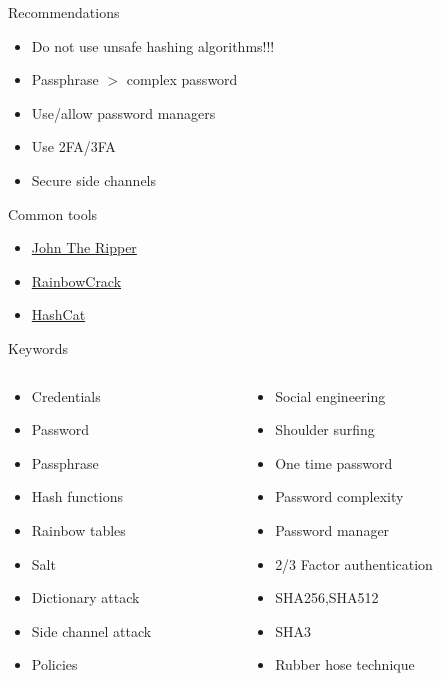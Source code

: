 \documentclass{curs}
\begin{document}
\begin{frame}{Recommendations}
  \begin{itemize}
    \item Do not use unsafe hashing algorithms!!!
    \item Passphrase $>$ complex password
    \item Use/allow password managers
    \item Use 2FA/3FA
    \item Secure side channels
  \end{itemize}
\end{frame}

\begin{frame}{Common tools}
  \begin{itemize}
    \item \href{http://www.openwall.com/john/}{John The Ripper}
    \item \href{http://project-rainbowcrack.com/}{RainbowCrack}
    \item \href{https://hashcat.net/hashcat/}{HashCat}
  \end{itemize}
\end{frame}

\begin{frame}{Keywords}
  \begin{columns}
    \begin{column}{0.5\textwidth}
      \begin{itemize}
        \item Credentials
        \item Password
        \item Passphrase
        \item Hash functions
        \item Rainbow tables
        \item Salt
        \item Dictionary attack
        \item Side channel attack
        \item Policies
      \end{itemize}
    \end{column}
    \begin{column}{0.5\textwidth}
      \begin{itemize}
        \item Social engineering
        \item Shoulder surfing
        \item One time password
        \item Password complexity
        \item Password manager
        \item 2/3 Factor authentication
        \item SHA256,SHA512
        \item SHA3
        \item Rubber hose technique
      \end{itemize}
    \end{column}
  \end{columns}
\end{frame}
\end{document}
